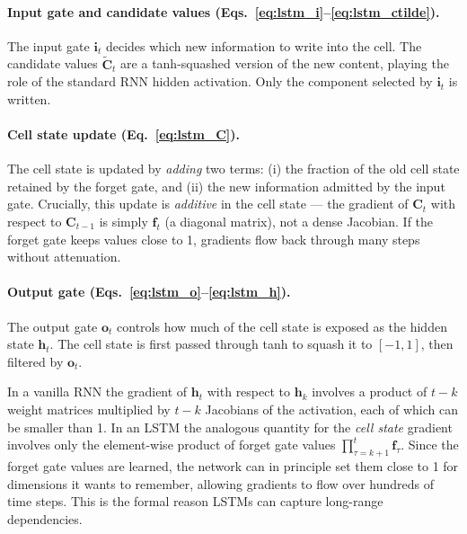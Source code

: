 \documentclass[11pt,a4paper]{article}
\begin{document}
\paragraph{Input gate and candidate values (Eqs.~\ref{eq:lstm_i}--\ref{eq:lstm_ctilde}).} The input gate $\mathbf{i}_t$ decides which new information to write into the cell. The candidate values $\tilde{\mathbf{C}}_t$ are a tanh-squashed version of the new content, playing the role of the standard RNN hidden activation. Only the component selected by $\mathbf{i}_t$ is written.

\paragraph{Cell state update (Eq.~\ref{eq:lstm_C}).} The cell state is updated by \emph{adding} two terms: (i) the fraction of the old cell state retained by the forget gate, and (ii) the new information admitted by the input gate. Crucially, this update is \emph{additive} in the cell state — the gradient of $\mathbf{C}_t$ with respect to $\mathbf{C}_{t-1}$ is simply $\mathbf{f}_t$ (a diagonal matrix), not a dense Jacobian. If the forget gate keeps values close to 1, gradients flow back through many steps without attenuation.

\paragraph{Output gate (Eqs.~\ref{eq:lstm_o}--\ref{eq:lstm_h}).} The output gate $\mathbf{o}_t$ controls how much of the cell state is exposed as the hidden state $\mathbf{h}_t$. The cell state is first passed through tanh to squash it to $[-1,1]$, then filtered by $\mathbf{o}_t$.

\begin{insightbox}
In a vanilla RNN the gradient of $\mathbf{h}_t$ with respect to $\mathbf{h}_k$ involves a product of $t-k$ weight matrices multiplied by $t-k$ Jacobians of the activation, each of which can be smaller than 1. In an LSTM the analogous quantity for the \emph{cell state} gradient involves only the element-wise product of forget gate values $\prod_{\tau=k+1}^{t}\mathbf{f}_\tau$. Since the forget gate values are learned, the network can in principle set them close to 1 for dimensions it wants to remember, allowing gradients to flow over hundreds of time steps. This is the formal reason LSTMs can capture long-range dependencies.
\end{insightbox}
\end{document}

